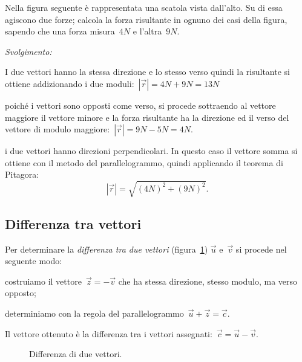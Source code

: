 \begin{exrig}
\begin{esempio}
Nella figura seguente è rappresentata una scatola vista dall'alto. Su di essa 
agiscono due forze; calcola la forza risultante in ognuno dei casi della figura,
sapendo che una forza misura~$4 \unit{N}$ e l'altra~$9 \unit{N}$.
\begin{center}
 
\end{center}
\emph{Svolgimento:}
\begin{enumeratea}
\item I due vettori hanno la stessa direzione e lo stesso verso quindi la 
risultante si ottiene addizionando i due moduli:~$|\vec{r}|=4 \unit{N}+9 
\unit{N}=13 \unit{N}$
\item poiché i vettori sono opposti come verso, si procede sottraendo al 
vettore maggiore il vettore minore e la forza risultante ha la direzione ed il 
verso
del vettore di modulo maggiore:~$|\vec{r}|=9 \unit{N} - 5 \unit{N}=4 \unit{N}$.
\item i due vettori hanno direzioni perpendicolari. In questo caso il vettore 
somma si ottiene con il metodo del parallelogrammo, quindi applicando il 
teorema di Pitagora:
\[|\vec{r}|=\sqrt{(4 \unit{N})^2+(9 \unit{N})^2}.\]
\end{enumeratea}
\end{esempio}
\end{exrig}

\subsection{Differenza tra vettori}

\begin{procedura} Per determinare la \emph{differenza tra due vettori} 
(figura~\ref{fig:F.11}) $\vec{u}$ e~$\vec{v}$
si procede nel seguente modo:
\begin{enumeratea}
\item costruiamo il vettore~$\vec{z}=-\vec{v}$ che ha stessa direzione, stesso 
modulo, ma verso opposto;
\item determiniamo con la regola del parallelogrammo~$\vec{u}+\vec{z}=\vec{c}$.
\end{enumeratea}
Il vettore ottenuto è la differenza tra i vettori 
assegnati:~$\vec{c}=\vec{u}-\vec{v}$.
\end{procedura}

\begin{inaccessibleblock}
 \begin{figure}[t]
 \centering
 
 \caption{Differenza di due vettori.}
 \label{fig:F.11}
\end{figure}
\end{inaccessibleblock}

